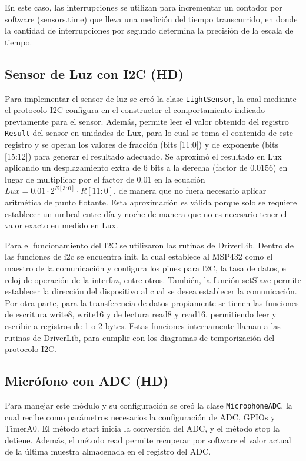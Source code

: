 En este caso, las interrupciones se utilizan para incrementar un contador por software
(sensors.time) que lleva una medición del tiempo transcurrido, en donde la cantidad de
interrupciones por segundo determina la precisión de la escala de tiempo.

\subsection{Sensor de Luz con I2C (HD)}
Para implementar el sensor de luz se creó la clase \texttt{LightSensor}, la cual mediante el
protocolo I2C configura en el constructor el comportamiento indicado previamente para el
sensor. Además, permite leer el valor obtenido del registro \texttt{Result} del sensor en unidades
de Lux, para lo cual se toma el contenido de este registro y se operan los valores de fracción (bits
[11:0]) y de exponente (bits [15:12]) para generar el resultado adecuado. Se aproximó el resultado
en Lux aplicando un desplazamiento extra de 6 bits a la derecha (factor de $0.0156$) en lugar de
multiplicar por el factor de $0.01$ en la ecuación $Lux = 0.01 \cdot 2^{E[3:0]} \cdot R[11:0]$, de
manera que no fuera necesario aplicar aritmética de punto flotante. Esta aproximación es válida
porque solo se requiere establecer un umbral entre día y noche de manera que no es necesario tener
el valor exacto en medido en Lux.

Para el funcionamiento del I2C se utilizaron las rutinas de DriverLib.  Dentro de las funciones de
i2c se encuentra init, la cual establece al MSP432 como el maestro de la comunicación y configura
los pines para I2C, la tasa de datos, el reloj de operación de la interfaz, entre otros. También, la
función setSlave permite establecer la dirección del dispositivo al cual se desea establecer la
comunicación. Por otra parte, para la transferencia de datos propiamente se tienen las funciones de
escritura write8, write16 y de lectura read8 y read16, permitiendo leer y escribir a registros de 1
o 2 bytes. Estas funciones internamente llaman a las rutinas de DriverLib, para cumplir con los
diagramas de temporización del protocolo I2C.


\subsection{Micrófono con ADC (HD)}
Para manejar este módulo y su configuración se creó la clase \texttt{MicrophoneADC}, la cual recibe
como parámetros necesarios la configuración de ADC, GPIOs y TimerA0. El método start
inicia la conversión del ADC, y el método stop la detiene. Además, el método read permite
recuperar por software el valor actual de la última muestra almacenada en el registro del ADC.

